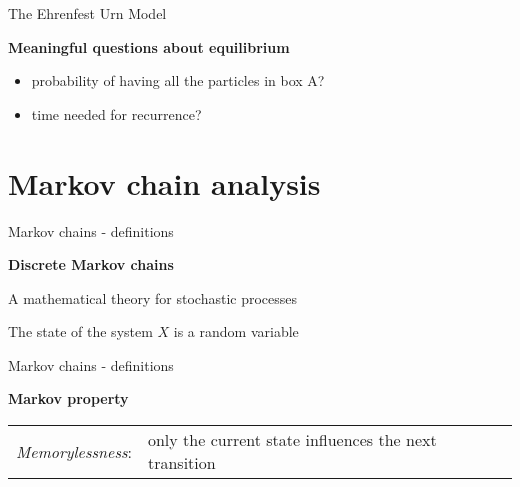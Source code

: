 \documentclass[usenames,dvipsnames]{beamer}
\begin{document}
  \begin{frame}{The Ehrenfest Urn Model}
    \begin{center}
      \textbf{Meaningful questions about equilibrium}
    \end{center}
    \begin{itemize}
      \item probability of having all the particles in box A?
    \end{itemize}
    \begin{figure}
      
    \end{figure}
    \begin{itemize}
      \item time needed for recurrence?
    \end{itemize}
    \begin{figure}
      
    \end{figure}
  \end{frame}

  \section{Markov chain analysis}
  \begin{frame}{Markov chains - definitions}
    \begin{center}
      \Large{\textbf{Discrete Markov chains}}
    \end{center}
    A mathematical theory for stochastic processes

    The state of the system $X$ is a random variable

    \bigskip
    \begin{figure}
      
    \end{figure}
  \end{frame}

  \begin{frame}{Markov chains - definitions}
    \begin{center}
      \Large{\textbf{Markov property}}
    \end{center}
    \begin{table}
      \begin{tabularx}{\textwidth}{c >{\raggedright}X}
        \alert{\emph{Memorylessness}}: & only the current state influences the next transition \tabularnewline
      \end{tabularx}
    \end{table}
  \end{frame}
\end{document}
